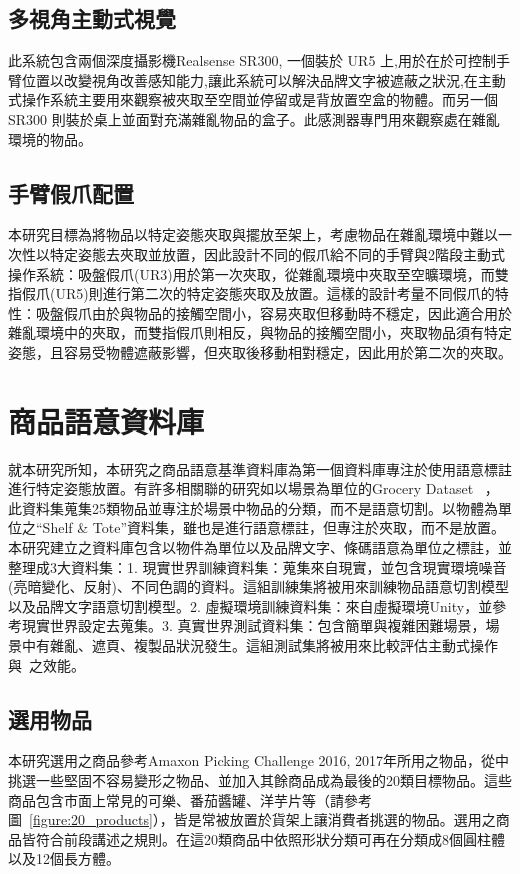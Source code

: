 \subsection{多視角主動式視覺}
此系統包含兩個深度攝影機Realsense SR300, 一個裝於 UR5 上,用於在於可控制手臂位置以改變視角改善感知能力,讓此系統可以解決品牌文字被遮蔽之狀況,在主動式操作系統主要用來觀察被夾取至空間並停留或是背放置空盒的物體。而另一個 SR300 則裝於桌上並面對充滿雜亂物品的盒子。此感測器專門用來觀察處在雜亂環境的物品。

\subsection{手臂假爪配置}
本研究目標為將物品以特定姿態夾取與擺放至架上，考慮物品在雜亂環境中難以一次性以特定姿態去夾取並放置，因此設計不同的假爪給不同的手臂與2階段主動式操作系統：吸盤假爪(UR3)用於第一次夾取，從雜亂環境中夾取至空曠環境，而雙指假爪(UR5)則進行第二次的特定姿態夾取及放置。這樣的設計考量不同假爪的特性：吸盤假爪由於與物品的接觸空間小，容易夾取但移動時不穩定，因此適合用於雜亂環境中的夾取，而雙指假爪則相反，與物品的接觸空間小，夾取物品須有特定姿態，且容易受物體遮蔽影響，但夾取後移動相對穩定，因此用於第二次的夾取。


\section{商品語意資料庫}
就本研究所知，本研究之商品語意基準資料庫為第一個資料庫專注於使用語意標註進行特定姿態放置。有許多相關聯的研究如以場景為單位的Grocery Dataset ~\cite{jund2016freiburg}，此資料集蒐集25類物品並專注於場景中物品的分類，而不是語意切割。以物體為單位之``Shelf \& Tote''資料集，雖也是進行語意標註，但專注於夾取，而不是放置。本研究建立之資料庫包含以物件為單位以及品牌文字、條碼語意為單位之標註，並整理成3大資料集：1. 現實世界訓練資料集：蒐集來自現實，並包含現實環境噪音(亮暗變化、反射)、不同色調的資料。這組訓練集將被用來訓練物品語意切割模型以及品牌文字語意切割模型。2. 虛擬環境訓練資料集：來自虛擬環境Unity，並參考現實世界設定去蒐集。3. 真實世界測試資料集：包含簡單與複雜困難場景，場景中有雜亂、遮頁、複製品狀況發生。這組測試集將被用來比較評估主動式操作與~\cite{peterthesis}之效能。

\subsection{選用物品}
本研究選用之商品參考Amaxon Picking Challenge 2016, 2017年所用之物品，從中挑選一些堅固不容易變形之物品、並加入其餘商品成為最後的20類目標物品。這些商品包含市面上常見的可樂、番茄醬罐、洋芋片等（請參考圖~\ref{figure:20_products}），皆是常被放置於貨架上讓消費者挑選的物品。選用之商品皆符合前段講述之規則。在這20類商品中依照形狀分類可再在分類成8個圓柱體以及12個長方體。

